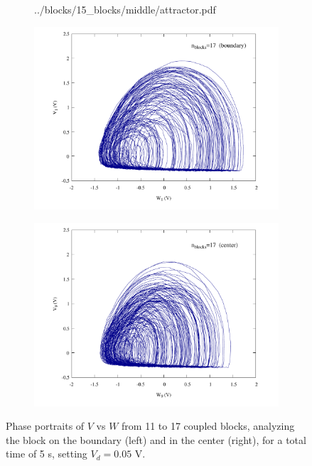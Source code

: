 \begin{figure}[ht!]
\begin{minipage}{.47\textwidth}
\begin{subfigure}{\linewidth}
            {../blocks/15_blocks/middle/attractor.pdf}
        \end{subfigure}
    \end{minipage}
    \begin{minipage}{.47\textwidth}
        \begin{subfigure}{\linewidth}
            \centering
            \includegraphics[width=\linewidth]
            {../blocks/17_blocks/edge/attractor.pdf}
        \end{subfigure}
    \end{minipage}
    \begin{minipage}{.47\textwidth}
        \begin{subfigure}{\linewidth}
            \centering
            \includegraphics[width=\linewidth]
            {../blocks/17_blocks/middle/attractor.pdf}
        \end{subfigure}
    \end{minipage}
    \caption{Phase portraits of $V$ vs $W$ from 11 to 17 coupled blocks, analyzing the block on the boundary
    (left) and in the center (right), for a total time of 5 s, setting $V_d=0.05$ V.}\label{fig:attractors 11-17}
\end{figure}

